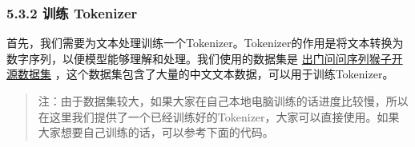 \documentclass[12pt,a4paper]{book}
\begin{document}
\subsubsection{5.3.2 训练 Tokenizer}\label{ux8badux7ec3-tokenizer-1}

首先，我们需要为文本处理训练一个Tokenizer。Tokenizer的作用是将文本转换为数字序列，以便模型能够理解和处理。我们使用的数据集是
\href{https://www.modelscope.cn/datasets/ddzhu123/seq-monkey/files}{出门问问序列猴子开源数据集}
，这个数据集包含了大量的中文文本数据，可以用于训练Tokenizer。

\begin{quote}
注：由于数据集较大，如果大家在自己本地电脑训练的话进度比较慢，所以在这里我们提供了一个已经训练好的Tokenizer，大家可以直接使用。如果大家想要自己训练的话，可以参考下面的代码。
\end{quote}

\begin{Shaded}
\begin{Highlighting}[]
\end{Highlighting}
\end{Shaded}
\end{document}
